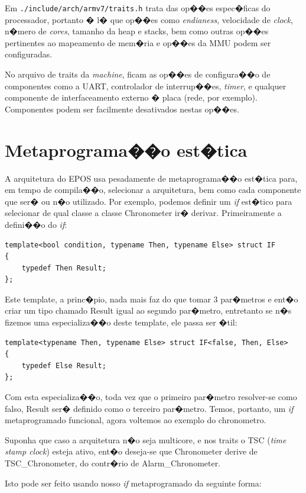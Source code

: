 \documentclass{ufscThesis/ufscThesis} %
\begin{document}
Em \verb+./include/arch/armv7/traits.h+ trata das op��es espec�ficas do processador, portanto � l� que op��es como \emph{endianess}, velocidade de \emph{clock}, n�mero de \emph{cores}, tamanho da heap e stacks, bem como outras op��es pertinentes ao mapeamento de mem�ria e op��es da MMU podem ser configuradas.

No arquivo de traits da \emph{machine}, ficam as op��es de configura��o de componentes como a UART, controlador de interrup��es, \emph{timer}, e qualquer componente de interfaceamento externo � placa (rede, por exemplo). Componentes podem ser facilmente desativados nestas op��es.

\section{Metaprograma��o est�tica}

A arquitetura do EPOS usa pesadamente de metaprograma��o est�tica para, em tempo de compila��o, selecionar a arquitetura, bem como cada componente que ser� ou n�o utilizado. Por exemplo, podemos definir um \emph{if} est�tico para selecionar de qual classe a classe Chronometer ir� derivar. Primeiramente a defini��o do \emph{if}:

\begin{verbatim}
template<bool condition, typename Then, typename Else> struct IF
{
    typedef Then Result;
};
\end{verbatim}

Este template, a princ�pio, nada mais faz do que tomar 3 par�metros e ent�o criar um tipo chamado Result igual ao segundo par�metro, entretanto se n�s fizemos uma especializa��o deste template, ele passa ser �til:

\begin{verbatim}
template<typename Then, typename Else> struct IF<false, Then, Else>
{
    typedef Else Result;
};
\end{verbatim}

Com esta especializa��o, toda vez que o primeiro par�metro resolver-se como falso, Result ser� definido como o terceiro par�metro. Temos, portanto, um \emph{if} metaprogramado funcional, agora voltemos ao exemplo do chronometro.

Suponha que caso a arquitetura n�o seja multicore, e nos traits o TSC (\emph{time stamp clock}) esteja ativo, ent�o deseja-se que Chronometer derive de TSC\_Chronometer, do contr�rio de Alarm\_Chronometer.

Isto pode ser feito usando nosso \emph{if} metaprogramado da seguinte forma:
\end{document}
